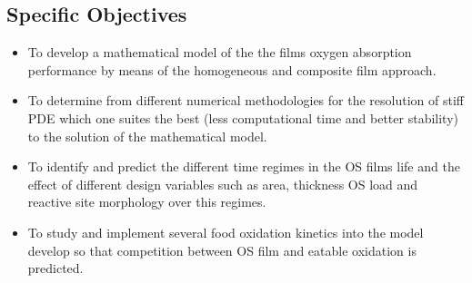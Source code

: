 \begin{refsection}
\subsection{Specific Objectives}
\begin{itemize}
    \item To develop a mathematical model of the the films oxygen absorption performance by means of the homogeneous and composite film approach.
    \item To determine from different numerical methodologies for the resolution of stiff PDE which one suites the best (less computational time and better stability) to the solution of the mathematical model. 
    \item To identify and predict the different time regimes in the OS films  life and the effect of different design variables such as area, thickness  OS load and reactive site morphology over this regimes. 
    \item To study and implement several food oxidation kinetics into the model develop so that competition between OS film and eatable oxidation is predicted.
\end{itemize}
\vspace{\fill}



\printbibliography
\end{refsection}